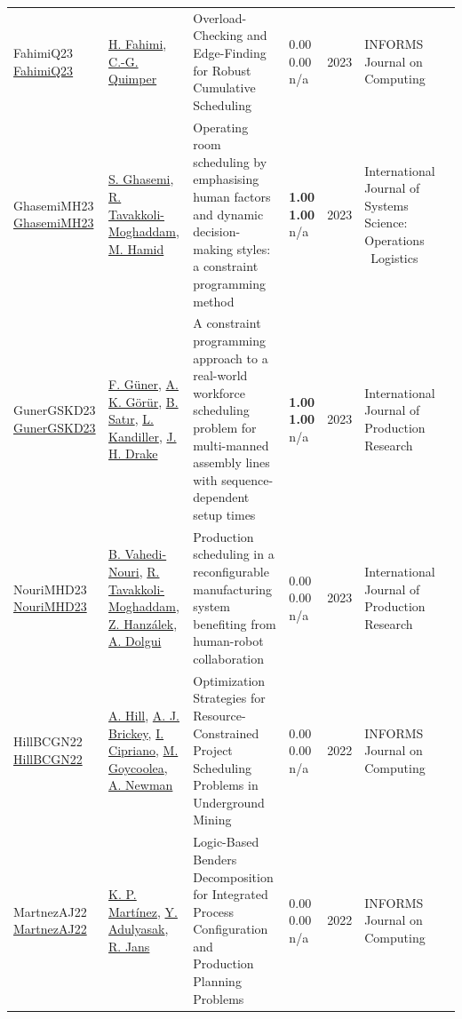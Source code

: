 {\begin{longtable}{p{3cm}p{5cm}p{10cm}p{1cm}rp{2.5cm}l}
FahimiQ23 \href{http://dx.doi.org/10.1287/ijoc.2021.0138}{FahimiQ23} & \hyperref[auth:a122]{H. Fahimi}, \hyperref[auth:a37]{C.-G. Quimper} & Overload-Checking and Edge-Finding for Robust Cumulative Scheduling & \noindent{}\textcolor{black!50}{0.00} \textcolor{black!50}{0.00} n/a & 2023 & \cellcolor{red!20}INFORMS Journal on Computing & \cite{FahimiQ23}\\
GhasemiMH23 \href{http://dx.doi.org/10.1080/23302674.2023.2224509}{GhasemiMH23} & \hyperref[auth:a980]{S. Ghasemi}, \hyperref[auth:a429]{R. Tavakkoli-Moghaddam}, \hyperref[auth:a981]{M. Hamid} & Operating room scheduling by emphasising human factors and dynamic decision-making styles: a constraint programming method & \noindent{}\textbf{1.00} \textbf{1.00} n/a & 2023 & \cellcolor{red!20}International Journal of Systems Science: Operations \  Logistics & \cite{GhasemiMH23}\\
GunerGSKD23 \href{http://dx.doi.org/10.1080/00207543.2023.2226772}{GunerGSKD23} & \hyperref[auth:a1425]{F. G\"{u}ner}, \hyperref[auth:a1426]{A. K. G\"{o}r\"{u}r}, \hyperref[auth:a1427]{B. Satır}, \hyperref[auth:a1428]{L. Kandiller}, \hyperref[auth:a1429]{J. H. Drake} & A constraint programming approach to a real-world workforce scheduling problem for multi-manned assembly lines with sequence-dependent setup times & \noindent{}\textbf{1.00} \textbf{1.00} n/a & 2023 & \cellcolor{red!20}International Journal of Production Research & \cite{GunerGSKD23}\\
NouriMHD23 \href{http://dx.doi.org/10.1080/00207543.2023.2173503}{NouriMHD23} & \hyperref[auth:a736]{B. Vahedi-Nouri}, \hyperref[auth:a429]{R. Tavakkoli-Moghaddam}, \hyperref[auth:a945]{Z. Hanzálek}, \hyperref[auth:a946]{A. Dolgui} & Production scheduling in a reconfigurable manufacturing system benefiting from human-robot collaboration & \noindent{}\textcolor{black!50}{0.00} \textcolor{black!50}{0.00} n/a & 2023 & \cellcolor{red!20}International Journal of Production Research & \cite{NouriMHD23}\\
HillBCGN22 \href{http://dx.doi.org/10.1287/ijoc.2022.1222}{HillBCGN22} & \hyperref[auth:a64]{A. Hill}, \hyperref[auth:a970]{A. J. Brickey}, \hyperref[auth:a971]{I. Cipriano}, \hyperref[auth:a972]{M. Goycoolea}, \hyperref[auth:a973]{A. Newman} & Optimization Strategies for Resource-Constrained Project Scheduling Problems in Underground Mining & \noindent{}\textcolor{black!50}{0.00} \textcolor{black!50}{0.00} n/a & 2022 & \cellcolor{red!20}INFORMS Journal on Computing & \cite{HillBCGN22}\\
MartnezAJ22 \href{http://dx.doi.org/10.1287/ijoc.2021.1079}{MartnezAJ22} & \hyperref[auth:a934]{K. P. Martínez}, \hyperref[auth:a935]{Y. Adulyasak}, \hyperref[auth:a840]{R. Jans} & Logic-Based Benders Decomposition for Integrated Process Configuration and Production Planning Problems & \noindent{}\textcolor{black!50}{0.00} \textcolor{black!50}{0.00} n/a & 2022 & \cellcolor{red!20}INFORMS Journal on Computing & \cite{MartnezAJ22}\\

\end{longtable}}
